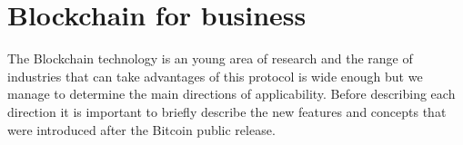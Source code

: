 \section{Blockchain for business}
\label{sec:chapter1-sec2}
The Blockchain technology is an young area of research and the range of industries that can take advantages of this protocol is wide enough but we manage to determine the main directions of applicability. Before describing each direction it is important to briefly describe the new features and concepts that were introduced after the Bitcoin public release.





 

